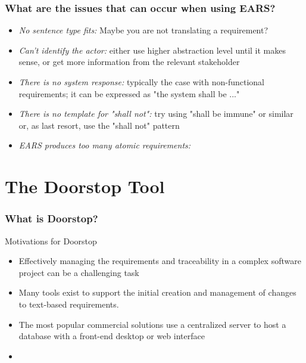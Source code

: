\documentclass[aspectratio=169]{beamer}
\begin{document}
\begin{frame}
  \frametitle{What are the issues that can occur when using EARS?}
  \begin{itemize}
  \item {\it No sentence type fits:} Maybe you are not translating a requirement?
  \item {\it Can't identify the actor:} either use higher abstraction level until it makes sense, or get more information from the relevant stakeholder
  \item {\it There is no system response:}  typically the case with non-functional requirements; it can be expressed as "the system shall be ..."
  \item {\it There is no template for "shall not":} try using "shall be immune" or similar or, as last resort, use the "shall not" pattern
  \item {\it EARS produces too many atomic requirements:} 
  \end{itemize}
  
\end{frame}

\section*{The Doorstop Tool}


\begin{frame}
  \frametitle{What is Doorstop?}
  \begin{block}{Motivations for Doorstop}
  \begin{itemize}
    \item Effectively managing the requirements and traceability in a complex software project can be a
challenging task
    \item Many tools exist to support the initial creation and management of changes to
text-based requirements.
    \item The most popular commercial solutions use a centralized server to host
a database with a front-end desktop or web interface
    \item {\bf }
  \end{itemize}
  
  \end{block}

   
\end{frame}
\end{document}
